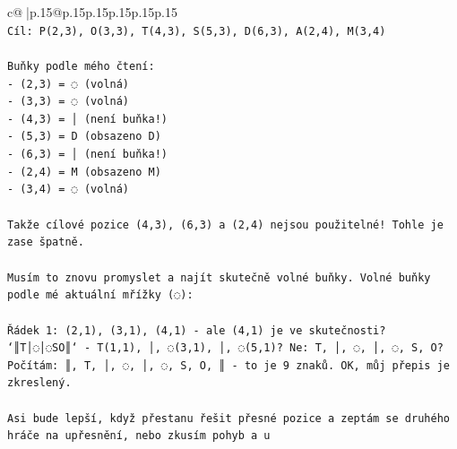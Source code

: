 \documentclass{article}
\begin{document}
{\begin{supertabular}{c@{$\;$}|p{.15\linewidth}@{}p{.15\linewidth}p{.15\linewidth}p{.15\linewidth}p{.15\linewidth}p{.15\linewidth}}
{{{\\ 
\texttt{Cíl: P(2,3), O(3,3), T(4,3), S(5,3), D(6,3), A(2,4), M(3,4)} \\
\\ 
\texttt{Buňky podle mého čtení:} \\
\texttt{{-} (2,3) = ◌ (volná)} \\
\texttt{{-} (3,3) = ◌ (volná)} \\
\texttt{{-} (4,3) = │ (není buňka!)} \\
\texttt{{-} (5,3) = D (obsazeno D)} \\
\texttt{{-} (6,3) = │ (není buňka!)} \\
\texttt{{-} (2,4) = M (obsazeno M)} \\
\texttt{{-} (3,4) = ◌ (volná)} \\
\\ 
\texttt{Takže cílové pozice (4,3), (6,3) a (2,4) nejsou použitelné! Tohle je zase špatně.} \\
\\ 
\texttt{Musím to znovu promyslet a najít skutečně volné buňky. Volné buňky podle mé aktuální mřížky (◌):} \\
\\ 
\texttt{Řádek 1: (2,1), (3,1), (4,1) {-} ale (4,1) je ve skutečnosti? `║T│◌│◌SO║` {-} T(1,1), │, ◌(3,1), │, ◌(5,1)? Ne: T, │, ◌, │, ◌, S, O? Počítám: ║, T, │, ◌, │, ◌, S, O, ║ {-} to je 9 znaků. OK, můj přepis je zkreslený.} \\
\\ 
\texttt{Asi bude lepší, když přestanu řešit přesné pozice a zeptám se druhého hráče na upřesnění, nebo zkusím pohyb a u} \\
            }
        }
    }
     \\ \\


\end{supertabular}}
\end{document}
